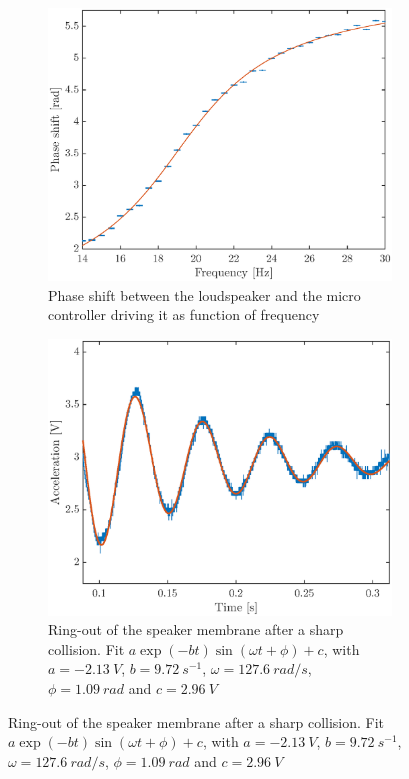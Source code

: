 \documentclass[12pt,oneside,a4paper]{article}
\numberwithin{equation}{section}
\begin{document}
{{{{\begin{figure}[h]
	\centering
	\begin{subfigure}[t]{0.49\textwidth}
		\includegraphics[width=\textwidth]{pshiftplot.eps} 
		\caption{Phase shift between the loudspeaker and the micro controller driving it as function of frequency}
		\label{phaseshift_plot}
	\end{subfigure} \hfill 
	\begin{subfigure}[t]{0.49\textwidth}
		\centering
		\includegraphics[width=\textwidth]{ringout.eps}
		\caption{Ring-out of the speaker membrane after a sharp collision. Fit $a\exp(-bt)\sin(\omega t + \phi)+c$, with $a=\SI{-2.13}{V}$, $b=\SI{9.72}{s^{-1}}$, $\omega=\SI{127.6}{rad/s}$, $\phi=\SI{1.09}{rad}$ and $c=\SI{2.96}{V}$}

\end{subfigure}
\end{figure}}}}}
\end{document}
